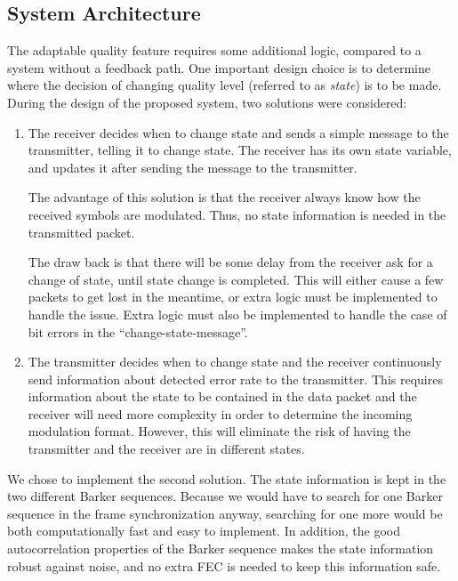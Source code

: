 
 
\subsection{System Architecture}
The adaptable quality feature requires some additional logic, compared to a system without a feedback path. One important design choice is to determine where the decision of changing quality level (referred to as \textit{state}) is to be made. During the design of the proposed system, two solutions were considered:
\begin{enumerate}
\item 
The receiver decides when to change state and sends a simple message to the transmitter, telling it to change state. The receiver has its own state variable, and updates it after sending the message to the transmitter.

The advantage of this solution is that the receiver always know how the received symbols are modulated. Thus, no state information is needed in the transmitted packet. 

The draw back is that there will be some delay from the receiver ask for a change of state, until state change is completed. This will either cause a few packets to get lost in the meantime, or extra logic must be implemented to handle the issue. Extra logic must also be implemented to handle the case of bit errors in the ``change-state-message''.

\item
The transmitter decides when to change state and the receiver continuously send information about detected error rate to the transmitter. This requires information about the state to be contained in the data packet and the receiver will need more complexity in order to determine the incoming modulation format. 
However, this will eliminate the risk of having the transmitter and the receiver are in different states. 
\end{enumerate}
We chose to implement the second solution. The state information is kept in the two different Barker sequences. Because we would have to search for one Barker sequence in the frame synchronization anyway, searching for one more would be both computationally fast and easy to implement. In addition, the good autocorrelation properties of the Barker sequence makes the state information robust against noise, and no extra FEC is needed to keep this information safe. 

